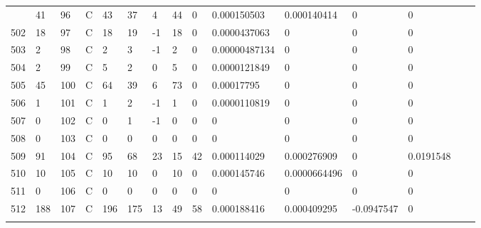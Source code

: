 \begin{longtable}{lllllllllllllll}
\begin{comment}
	501 & 41                & 96  & C   & 43                & 37                & 4                 & 44   & 0          & 0.000150503    & 0.000140414    & 0             & 0            \\
	502 & 18                & 97  & C   & 18                & 19                & -1                & 18   & 0          & 0.0000437063   & 0              & 0             & 0            \\
	503 & 2                 & 98  & C   & 2                 & 3                 & -1                & 2    & 0          & 0.00000487134  & 0              & 0             & 0            \\
	504 & 2                 & 99  & C   & 5                 & 2                 & 0                 & 5    & 0          & 0.0000121849   & 0              & 0             & 0            \\
	505 & 45                & 100 & C   & 64                & 39                & 6                 & 73   & 0          & 0.00017795     & 0              & 0             & 0            \\
	506 & 1                 & 101 & C   & 1                 & 2                 & -1                & 1    & 0          & 0.0000110819   & 0              & 0             & 0            \\
	507 & 0                 & 102 & C   & 0                 & 1                 & -1                & 0    & 0          & 0              & 0              & 0             & 0            \\
	508 & 0                 & 103 & C   & 0                 & 0                 & 0                 & 0    & 0          & 0              & 0              & 0             & 0            \\
	509 & 91                & 104 & C   & 95                & 68                & 23                & 15   & 42         & 0.000114029    & 0.000276909    & 0             & 0.0191548    \\
	510 & 10                & 105 & C   & 10                & 10                & 0                 & 10   & 0          & 0.000145746    & 0.0000664496   & 0             & 0            \\
	511 & 0                 & 106 & C   & 0                 & 0                 & 0                 & 0    & 0          & 0              & 0              & 0             & 0            \\
	512 & 188               & 107 & C   & 196               & 175               & 13                & 49   & 58         & 0.000188416    & 0.000409295    & -0.0947547    & 0            \\

\end{comment}
\end{longtable}
